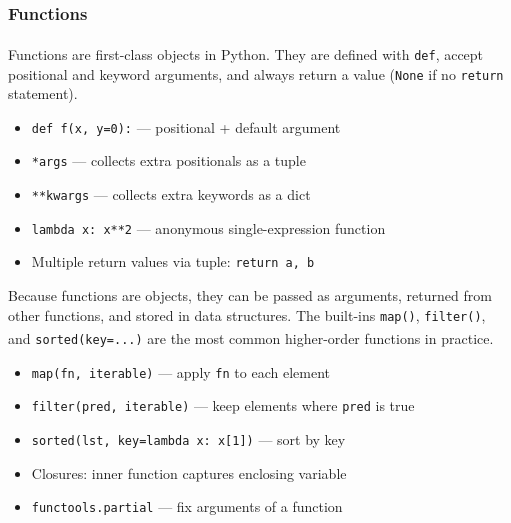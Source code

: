 \subsubsection{Functions}

\begin{tcbitemize}[ skin=sectionraster ]
    \tcbitem[title={Defining Functions}, raster multicolumn=3]
    Functions are first-class objects in Python\textsuperscript{\cite{romanoLearnPythonProgramming2021}}.
    They are defined with \texttt{def}, accept positional and keyword arguments, and always return a value (\texttt{None} if no \texttt{return} statement).
    \tcblower
    \begin{itemize}
        \item \texttt{def f(x, y=0):} --- positional + default argument
        \item \texttt{*args} --- collects extra positionals as a tuple
        \item \texttt{**kwargs} --- collects extra keywords as a dict
        \item \texttt{lambda x: x**2} --- anonymous single-expression function
        \item Multiple return values via tuple: \texttt{return a, b}
    \end{itemize}

    \tcbitem[title={Higher-Order Functions}, raster multicolumn=3]
    Because functions are objects, they can be passed as arguments, returned from other functions, and stored in data structures.
    The built-ins \texttt{map()}, \texttt{filter()}, and \texttt{sorted(key=...)} are the most common higher-order functions in practice\textsuperscript{\cite{romanoLearnPythonProgramming2021}}.
    \tcblower
    \begin{itemize}
        \item \texttt{map(fn, iterable)} --- apply \texttt{fn} to each element
        \item \texttt{filter(pred, iterable)} --- keep elements where \texttt{pred} is true
        \item \texttt{sorted(lst, key=lambda x: x[1])} --- sort by key
        \item Closures: inner function captures enclosing variable
        \item \texttt{functools.partial} --- fix arguments of a function
    \end{itemize}
\end{tcbitemize}

